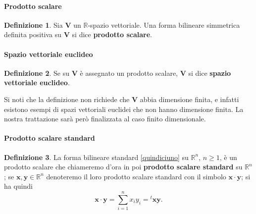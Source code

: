 \documentclass{article}
\theoremstyle{plain}
\theoremstyle{definition}
\newtheorem{defn}{Definizione}[section]
\theoremstyle{remark}
\begin{document}
\paragraph{Prodotto scalare}
\begin{bxthm}
\begin{defn}
Sia $\mathbf{V}$ un $\mathbb{R}$-spazio vettoriale. Una forma bilineare simmetrica definita positiva su 
$\mathbf{V}$ si dice \textbf{prodotto scalare}.     
\end{defn}
\end{bxthm}

\vspace{10pt}

\paragraph{Spazio vettoriale euclideo}
\begin{bxthm}
\begin{defn}
Se su $\mathbf{V}$ è assegnato un prodotto scalare, $\mathbf{V}$ si dice \textbf{spazio vettoriale euclideo}.    
\end{defn}
\end{bxthm}

\vspace{10pt}

Si noti che la definizione non richiede che $\mathbf{V}$ abbia dimensione finita, e infatti esistono esempi di spazi 
vettoriali euclidei che non hanno dimensione finita. La nostra trattazione sarà però finalizzata al caso finito dimensionale.

\vspace{10pt}

\paragraph{Prodotto scalare standard}
\begin{bxthm}
\begin{defn}
La forma bilineare standard \ref{quindiciuno} su $\mathbb{R}^n$, $n \geq 1$, è un prodotto scalare che chiameremo 
d'ora in poi \textbf{prodotto scalare standard} su $\mathbb{R}^n$; se $\mathbf{x}, \mathbf{y} \in \mathbb{R}^n$ denoteremo il loro prodotto scalare standard con il simbolo $\mathbf{x} \cdot \mathbf{y}$; si ha quindi
\[
\mathbf{x} \cdot \mathbf{y} = \sum_{i=1}^{n}x_i y_i = {}^t \mathbf{x} \mathbf{y}.
\]
\end{defn}
\end{bxthm}
\end{document}
